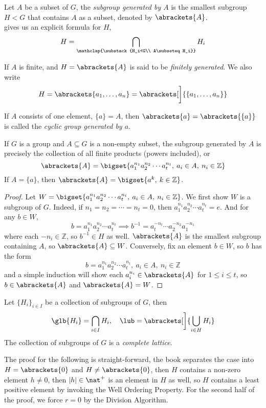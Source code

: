 \documentclass[../main-v2-manifolds.tex]{subfiles}
\begin{document}
\begin{definition}\label{hungerford-chp1:subgroup-generated-definition}
    Let $A$ be a subset of $G$, the \emph{subgroup generated by $A$} is the smallest subgroup $H<G$ that contains $A$ as a subset, denoted by $\abrackets{A}$.\\

     gives us an explicit formula for $H$,
    \[
        H = \bigcap_{\mathclap{\substack{H_i<G\\ A\subseteq H_i}}}H_i
    \]

    If $A$ is finite, and $H=\abrackets{A}$ is said to be \emph{finitely generated}. We also write 
    \[
        H = \abrackets{a_1,\ldots,a_n}=\abrackets[\bigg]{\{a_1,\ldots,a_n\}}
    \]
    
    If $A$ consists of one element, $\{a\}=A$, then $\abrackets{a}=\abrackets{\{a\}}$ is called the \emph{cyclic group generated by $a$}.
\end{definition}
\begin{wts}\label{hungerford-chp1:theorem2.8}
    If $G$ is a group and $A\subseteq G$ is a non-empty subset, the subgroup generated by $A$ is precisely the collection of all finite products (powers included), or
    \[
        \abrackets{A}=\bigset{a_1^{n_1}a_2^{n_2}\cdots a_t^{n_t},\: a_{i}\in A,\: n_i\in\mathbb{Z}}
    \]
    If $A=\{a\}$, then $\abrackets{A}=\bigset{a^k,\: k\in \mathbb{Z}}$.
\end{wts}
\begin{proof}
    Let $W=\bigset{a_1^{n_1}a_2^{n_2}\cdots a_t^{n_t},\: a_{i}\in A,\: n_i\in\mathbb{Z}}$. We first show $W$ is a subgroup of $G$. Indeed, if $n_1=n_2=\cdots=n_t=0$, then $a_1^{n_1}a_2^{n_2}\cdots a_t^{n_t}=e$. And for any $b\in W$, 
    \[
        b = a_1^{n_1}a_2^{n_2}\cdots a_t^{n_t}\implies b^{-1}=a_t^{-n_t}\cdots a_2^{-n_2}a_1^{-n_1}
    \]
    where each $-n_i\in \mathbb{Z}$, so $b^{-1}\in H$ as well. $\abrackets{A}$ is the smallest subgroup containing $A$, so $\abrackets{A}\subseteq W$. Conversely, fix an element $b\in W$, so $b$ has the form
    \[
        b = a_1^{n_1}a_2^{n_2}\cdots a_t^{n_t},\: a_i\in A,\: n_i\in \mathbb{Z}
    \]
    and a simple induction will show each $a_i^{n_i}\in \abrackets{A}$ for $1\leq i\leq t$, so $b\in \abrackets{A}$ and $\abrackets{A}=W$.
\end{proof}

\begin{definition}\label{hungerford-chp1:subgroup-lattice}
    Let $\{H_i\}_{i\in I}$ be a collection of subgroups of $G$, then 
    \[
        \glb\{H_i\}=\bigcap_{i\in I}H_i,\quad \lub=\abrackets[\bigg]{\bigcup_{i\in H}H_i}
    \]
    The collection of subgroups of $G$ is a \emph{complete lattice}.
\end{definition}
The proof for the following is straight-forward, the book separates the case into $H=\abrackets{0}$ and $H\neq\abrackets{0}$, then $H$ contains a non-zero element $h\neq 0$, then $|h|\in \nat^+$ is an element in $H$ as well, so $H$ contains a least positive element by invoking the Well Ordering Property. For the second half of the proof, we force $r=0$ by the Division Algorithm.
\end{document}
